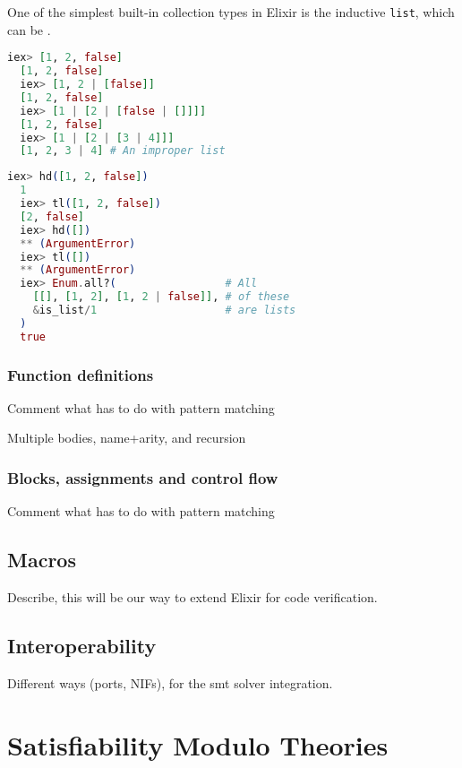 One of the simplest built-in collection types in Elixir is the inductive 
\verb|list|, which can be .

\begin{lstlisting}[language=elixir,numbers=none,frame=none]
  iex> [1, 2, false]
  [1, 2, false]
  iex> [1, 2 | [false]]
  [1, 2, false]
  iex> [1 | [2 | [false | []]]]
  [1, 2, false]
  iex> [1 | [2 | [3 | 4]]]
  [1, 2, 3 | 4] # An improper list
\end{lstlisting}

\begin{lstlisting}[language=elixir,numbers=none,frame=none]
  iex> hd([1, 2, false])
  1
  iex> tl([1, 2, false])
  [2, false]
  iex> hd([])
  ** (ArgumentError)
  iex> tl([])
  ** (ArgumentError)
  iex> Enum.all?(                 # All
    [[], [1, 2], [1, 2 | false]], # of these
    &is_list/1                    # are lists
  )
  true
\end{lstlisting}

\subsubsection{Function definitions}

Comment what has to do with pattern matching

Multiple bodies, name+arity, and recursion

\subsubsection{Blocks, assignments and control flow}

Comment what has to do with pattern matching

\subsection{Macros}

Describe, this will be our way to extend Elixir for code verification.

\subsection{Interoperability}

Different ways (ports, NIFs), for the \acrshort{smt} solver integration.

\section{Satisfiability Modulo Theories}

